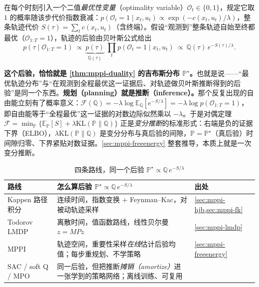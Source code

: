 \begin{definition}[最优性变量与规划即推断]\label{def:mppi-inference}
在每个时刻引入一个二值\emph{最优性变量}（optimality variable）$\mathcal{O}_t\in\{0,1\}$，规定它取 $1$ 的概率随该步代价指数衰减：$p(\mathcal{O}_t{=}1\mid x_t,u_t)\propto\exp(-c(x_t,u_t)/\lambda)$，整条轨迹代价 $S(\tau)=\sum_t c(x_t,u_t)$（含终端）。假设“观测到”整条轨迹自始至终都最优（$\mathcal{O}_{1:T}{=}1$），轨迹的后验由贝叶斯公式给出
\begin{equation}
  p(\tau\mid\mathcal{O}_{1:T}{=}1)\ \propto\ \underbrace{p(\tau)}_{\mathbb{Q}(\tau)}\;\prod_t p(\mathcal{O}_t{=}1\mid x_t,u_t)\ \propto\ \mathbb{Q}(\tau)\,e^{-S(\tau)/\lambda}.
  \label{eq:mppi-posterior}
\end{equation}
\end{definition}

\noindent \textbf{这个后验，恰恰就是 \cref{thm:mppi-duality} 的吉布斯分布 $\mathbb{P}^\star$。}也就是说——“最优轨迹分布”与“在观测到全程最优这一证据后、对轨迹做贝叶斯推断得到的后验”是同一个东西。\textbf{规划（planning）就是推断（inference）。}那个反复出现的自由能立刻有了概率意义：$\mathcal{F}(\mathbb{Q})=-\lambda\log\mathbb{E}_{\mathbb{Q}}[e^{-S/\lambda}]=-\lambda\log p(\mathcal{O}_{1:T}{=}1)$，即自由能等于“全程最优”这一证据的对数边际似然乘以 $-\lambda$。于是对偶定理 $\mathcal{F}=\min_{\mathbb{P}}\{\mathbb{E}_{\mathbb{P}}[S]+\lambda\mathrm{KL}(\mathbb{P}\|\mathbb{Q})\}$ 正是\emph{变分推断}的标准形式：右端是负的证据下界（ELBO），$\lambda\mathrm{KL}(\mathbb{P}\|\mathbb{Q})$ 是变分分布与真后验的间隙，$\mathbb{P}=\mathbb{P}^\star$（真后验）时间隙归零、下界紧贴对数证据。\cref{sec:mppi-freeenergy} 整套推导，本质上就是一次变分推断。

\begin{table}[H]\centering\small
\caption{四条路线，同一个后验 $\mathbb{P}^\star\propto\mathbb{Q}\,e^{-S/\lambda}$}
\label{tab:mppi-inference}
\begin{tabular}{lll}
\toprule
路线 & 怎么算后验 $\mathbb{P}^\star\propto\mathbb{Q}\,e^{-S/\lambda}$ & 出处 \\
\midrule
Kappen 路径积分 & 连续时间，指数变换 + Feynman--Kac，对被动轨迹采样 & \cref{sec:mppi-hjb,sec:mppi-fk} \\
Todorov LMDP & 离散时间，值函数路线，线性贝尔曼 $z=MPz$ & \cref{sec:mppi-lmdp} \\
MPPI & 轨迹空间，重要性采样\emph{在线}估计后验均值；每步重规划、不学策略 & \cref{sec:mppi-freeenergy} \\
SAC / soft Q / MPO & 同一后验，但把推断\emph{摊销（amortize）}进一张学到的策略网络；离线训练、可复用 & \cite{haarnoja2018soft,abdolmaleki2018maximum} \\
\bottomrule
\end{tabular}
\end{table}

